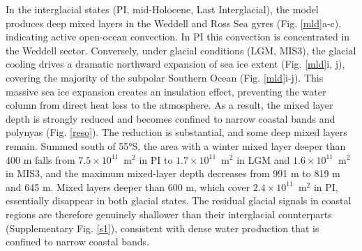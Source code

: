 \documentclass[pdflatex,sn-nature]{sn-jnl}
\begin{document}
In the interglacial states (PI, mid-Holocene, Last Interglacial), the model produces deep mixed layers in the Weddell and Ross Sea gyres (Fig. \ref{mld}a-c), indicating active open-ocean convection. In PI this convection is concentrated in the Weddell sector. Conversely, under glacial conditions (LGM, MIS3), the glacial cooling drives a dramatic northward expansion of sea ice extent (Fig. \ref{mld}i, j), covering the majority of the subpolar Southern Ocean (Fig. \ref{mld}i-j). This massive sea ice expansion creates an insulation effect, preventing the water column from direct heat loss to the atmosphere. As a result, the mixed layer depth is strongly reduced and becomes confined to narrow coastal bands and polynyas (Fig. \ref{reso}). The reduction is substantial, and some deep mixed layers remain. Summed south of 55°S, the area with a winter mixed layer deeper than 400 m falls from $7.5\times10^{11}$~m$^2$ in PI to $1.7\times10^{11}$~m$^2$ in LGM and $1.6\times10^{11}$~m$^2$ in MIS3, and the maximum mixed-layer depth decreases from 991 m to 819 m and 645 m. Mixed layers deeper than 600 m, which cover $2.4\times10^{11}$~m$^2$ in PI, essentially disappear in both glacial states. The residual glacial signals in coastal regions are therefore genuinely shallower than their interglacial counterparts (Supplementary Fig. \ref{s1}), consistent with dense water production that is confined to narrow coastal bands. %
\end{document}
